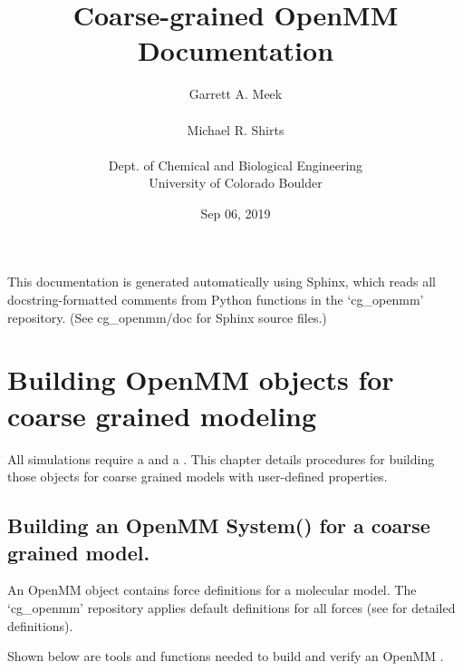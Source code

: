\documentclass[letterpaper,12pt,english,openany,oneside]{sphinxmanual}
\title{Coarse-grained OpenMM Documentation}
\date{Sep 06, 2019}
\author{Garrett A. Meek\\ \\Michael R. Shirts\\ \\Dept. of Chemical and Biological Engineering\\University of Colorado Boulder}
\begin{document}
\pagestyle{empty}
\sphinxmaketitle
\pagestyle{plain}
\sphinxtableofcontents
\pagestyle{normal}
\label{\detokenize{index::doc}}


This documentation is generated automatically using Sphinx, which reads all docstring-formatted comments from Python functions in the ‘cg\_openmm’ repository.  (See cg\_openmm/doc for Sphinx source files.)


\chapter{Building OpenMM objects for coarse grained modeling}
\label{\detokenize{build:building-openmm-objects-for-coarse-grained-modeling}}\label{\detokenize{build::doc}}
All  simulations require a  and a .  This chapter details procedures for building those objects for coarse grained models with user-defined properties.


\section{Building an OpenMM System() for a coarse grained model.}
\label{\detokenize{build:building-an-openmm-system-for-a-coarse-grained-model}}
An OpenMM  object contains force definitions for a molecular model.  The ‘cg\_openmm’ repository applies default definitions for all forces (see  for detailed definitions).

Shown below are tools and functions needed to build and verify an OpenMM  .

\label{\detokenize{build:module-build.cg_build}}
\end{document}
